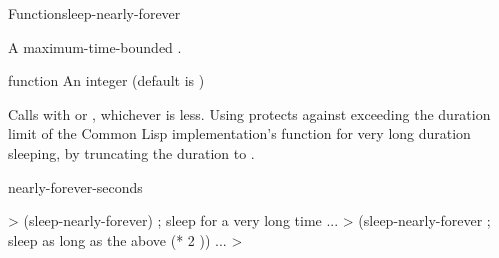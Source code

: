 \documentclass[10pt,twoside,english,pdftex]{article}
\begin{document}
\begin{functiondoc}{Function}{sleep-nearly-forever}{%
    }

\fnsyntax

\fnpurpose A maximum-time-bounded .

\fnpackage {}

\fnmodule {}

\fnargs
\begin{args}{function}
\arg[seconds] An integer (default is 
  )
\end{args}

\fndescription 
%
%
%
%
Calls  with  or , whichever is less.  Using  protects against exceeding the duration limit of the Common Lisp implementation's  function for very long duration sleeping, by truncating the duration to .


\begin{alsos}{nearly-forever-seconds}
\end{alsos}

%
\fnexamples
%
\W\supp
\begin{example}
  > (sleep-nearly-forever)    ; sleep for a very long time
        ...
  > (sleep-nearly-forever     ; sleep as long as the above
       (* 2 ))
        ...
  >
\end{example}

\end{functiondoc}

\end{document}
